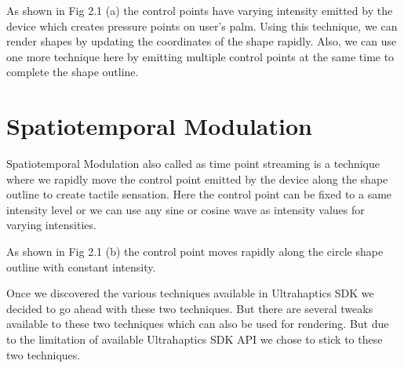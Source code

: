 As shown in Fig 2.1 (a) the control points have varying intensity emitted by the device which creates pressure points on user's palm. Using this technique, we can render shapes by updating the coordinates of  the shape rapidly. Also, we can use one more technique here by emitting multiple control points at the same time to complete the shape outline.


\section{Spatiotemporal Modulation}
\label{sec:related:sec2}

Spatiotemporal Modulation also called as time point streaming is a technique where we rapidly move the control point emitted by the device along the shape outline to create tactile sensation. Here the control point can be fixed to a same intensity level or we can use any sine or cosine wave as intensity values for varying intensities.\cite{tps} 

As shown in Fig 2.1 (b) the control point moves rapidly along the circle shape outline with constant intensity. 

Once we discovered the various techniques available in Ultrahaptics SDK we decided to go ahead with these two techniques. But there are several tweaks available to these two techniques which can also be used for rendering. But due to the limitation of available Ultrahaptics SDK API we chose to stick to these two techniques.  

